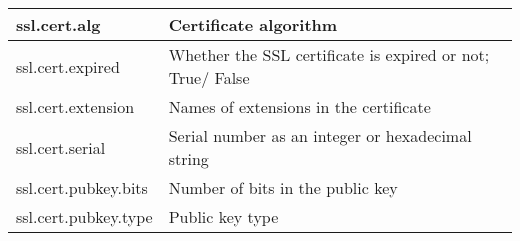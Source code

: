 \begin{table}[H]
{\begin{tabular}{|l|l|}
\hline
ssl.cert.alg                                                                    & Certificate algorithm                                                                                                                                                                                                                                                                                                                                                       \\ 
\hline
ssl.cert.expired                                                                & Whether the SSL certificate is expired or not; True/ False                                                                                                                                                                                                                                                                                                                  \\ 
\hline
ssl.cert.extension                                                              & Names of extensions in the certificate                                                                                                                                                                                                                                                                                                                                      \\ 
\hline
ssl.cert.serial                                                                 & Serial number as an integer or hexadecimal string                                                                                                                                                                                                                                                                                                                           \\ 
\hline
ssl.cert.pubkey.bits                                                            & Number of bits in the public key                                                                                                                                                                                                                                                                                                                                            \\ 
\hline
ssl.cert.pubkey.type                                                            & Public key type                                                                                                                                                                                                                                                                                                                                                             \\ 

\end{tabular}}
\end{table}
